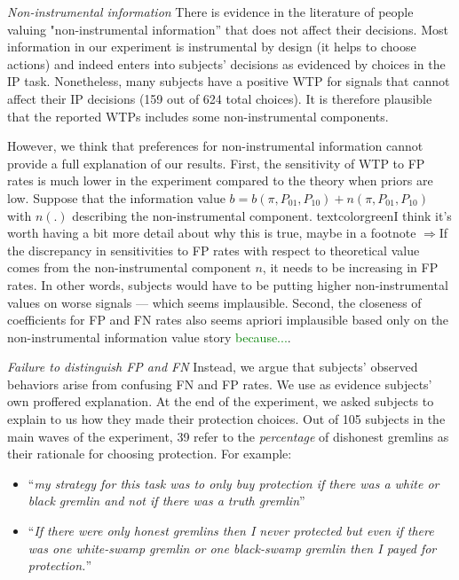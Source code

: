\documentclass[12pt,a4paper]{article}
\begin{document}
\emph{Non-instrumental information} There is evidence in the literature of people valuing "non-instrumental information'' that does not affect their decisions. %
Most information in our experiment is instrumental by design (it helps to choose actions) and indeed enters into subjects' decisions as evidenced by choices in the IP task. Nonetheless, many subjects have a positive WTP for signals that cannot affect their IP decisions (159 out of 624 total choices). It is therefore plausible that the reported WTPs includes some non-instrumental components. 

However, we think that preferences for non-instrumental information cannot provide a full explanation of our results.  First, the sensitivity of WTP to FP rates is much lower in the experiment compared to the theory when priors are low. Suppose that the information value $b = b(\pi,P_{01},P_{10})+n(\pi,P_{01},P_{10})$ with $n(.)$ describing the non-instrumental component. textcolor{green}{I think it's worth having a bit more detail about why this is true, maybe in a footnote $\Rightarrow$If the discrepancy in sensitivities to FP rates with respect to theoretical value comes from the non-instrumental component $n$, it needs to be increasing in FP rates. In other words, subjects would have to be putting higher non-instrumental values on worse signals --- which seems implausible.} Second, the closeness of coefficients for FP and FN rates also seems apriori implausible based only on the non-instrumental information value story \textcolor{green}{because...}.

\emph{Failure to distinguish FP and FN} Instead, we argue that subjects' observed behaviors arise from confusing FN and FP rates. We use as evidence subjects' own proffered explanation.  At the end of the experiment, we asked subjects to explain to us how they made their protection choices.  Out of 105 subjects in the main waves of the experiment, 39 refer to the \textit{percentage} \normalfont  of dishonest gremlins as their rationale for choosing protection. For example:
\begin{itemize}
	\item ``\emph{my strategy for this task was to only buy protection if there was a white or black gremlin and not if there was a truth gremlin}''
	\item ``\emph{If there were only honest gremlins then I never protected but even if there was one white-swamp gremlin or one black-swamp gremlin then I payed for protection.}''
\end{itemize}
\end{document}
